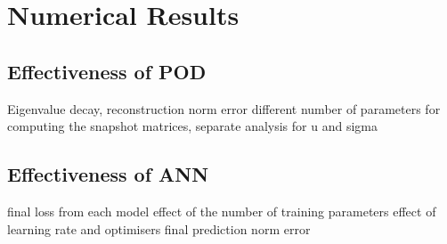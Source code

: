 \section{Numerical Results}

\subsection{Effectiveness of POD}

Eigenvalue decay, reconstruction norm error
different number of parameters for computing the snapshot matrices, separate analysis for u and sigma


\subsection{Effectiveness of ANN}

final loss from each model
effect of the number of training parameters
effect of learning rate and optimisers
final prediction norm error